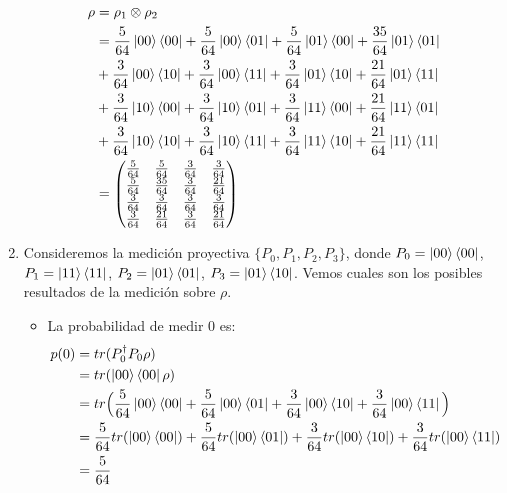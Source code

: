 \documentclass[a4paper,11pt]{article}
\begin{document}
\begin{enumerate}[label=\alph*)]
\begin{align*}
  \rho 
  &= \rho_1 \otimes \rho_2  
  \\ &= \frac{5}{64} \ket{00}\bra{00} + \frac{5}{64} \ket{00}\bra{01} + \frac{5}{64}\ket{01}\bra{00} + \frac{35}{64} \ket{01}\bra{01}
  \\ & + \frac{3}{64} \ket{00}\bra{10} + \frac{3}{64} \ket{00}\bra{11} + \frac{3}{64} \ket{01}\bra{10} + \frac{21}{64} \ket{01}\bra{11}
  \\ & + \frac{3}{64} \ket{10}\bra{00} + \frac{3}{64} \ket{10}\bra{01} + \frac{3}{64} \ket{11}\bra{00} + \frac{21}{64} \ket{11}\bra{01}
  \\ & + \frac{3}{64} \ket{10}\bra{10} + \frac{3}{64} \ket{10}\bra{11} + \frac{3}{64} \ket{11}\bra{10} + \frac{21}{64} \ket{11}\bra{11}
  \\ &= 
\begin{pmatrix}
\frac{5}{64} & \frac{5}{64} & \frac{3}{64} & \frac{3}{64}\\ 
\frac{5}{64} & \frac{35}{64} & \frac{3}{64} & \frac{21}{64}\\ 
 \frac{3}{64}& \frac{3}{64} & \frac{3}{64} & \frac{3}{64}\\ 
\frac{3}{64} & \frac{21}{64} & \frac{3}{64} & \frac{21}{64}
\end{pmatrix}
\end{align*}

\item Consideremos la medición proyectiva $\{ P_0, P_1, P_2, P_3 \}$, donde $P_0 = \ket{00}\bra{00}$, $P_1=\ket{11}\bra{11}$, 
$P_2 = \ket{01}\bra{01}$, $P_3 = \ket{01}\bra{10}$. Vemos cuales son los posibles resultados de la medición sobre $\rho$.

\begin{itemize}
\item La probabilidad de medir 0 es:
  \begin{align*}
    p(0)
    &= tr( P_0^{\dag} P_0 \rho )
    \\ &=  tr( \ket{00}\bra{00} \rho )
    \\ &= tr \Big( \frac{5}{64}\ket{00}\bra{00} + \frac{5}{64} \ket{00}\bra{01} + \frac{3}{64} \ket{00}\bra{10} + 
         \frac{3}{64}\ket{00}\bra{11} \Big)
    \\ &= \frac{5}{64} tr (\ket{00}\bra{00}) + \frac{5}{64} tr(\ket{00}\bra{01}) + \frac{3}{64} tr(\ket{00}\bra{10}) +
         \frac{3}{64} tr(\ket{00}\bra{11})
    \\ &= \frac{5}{64}
  \end{align*}


\end{itemize}
\end{enumerate}
\end{document}
